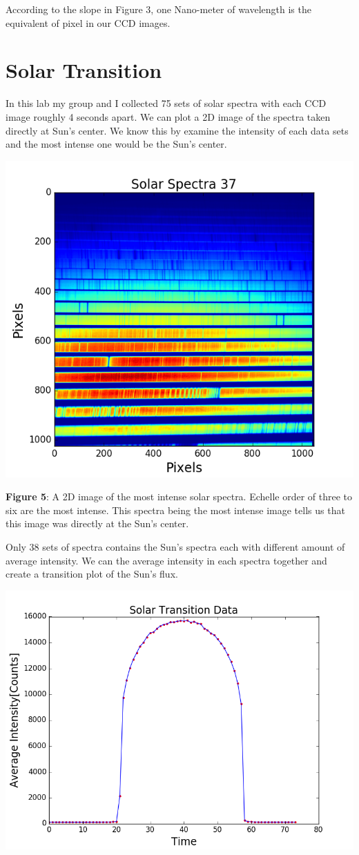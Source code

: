 \documentclass[onecolumn, 12pt, a4paper]{article}
\begin{document}
\begin{flushleft}
According to the slope in Figure 3, one Nano-meter of wavelength is the equivalent of  pixel in our CCD images.
\end{flushleft}
\section{Solar Transition}

In this lab my group and I collected 75 sets of solar spectra with each CCD image roughly 4 seconds apart. We can plot a 2D image of the spectra taken directly at Sun's center. We know this by examine the intensity of each data sets and the most intense one would be the Sun's center.

\centerline{\includegraphics[width=.55\linewidth]{figure_1-4.png}} \newline

\textbf{Figure 5}: A 2D image of the most intense solar spectra. Echelle order of three to six are the most intense. This spectra being the most intense image tells us that this image was directly at the Sun's center.

\begin{flushleft}
Only 38 sets of spectra contains the Sun's spectra each with different amount of average intensity. We can the average intensity in each spectra together and create a transition plot of the Sun's flux. 
\end{flushleft}

\centerline{\includegraphics[width=.55\linewidth]{figure_1-5.png}}\newline
\end{document}
